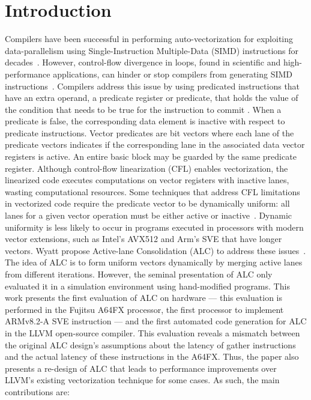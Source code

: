 \section{Introduction}

Compilers have been successful in performing auto-vectorization for exploiting data-parallelism using Single-Instruction Multiple-Data (SIMD) instructions for decades~\cite{scarborough1986vectorizing,levine1991comparative,sreraman2000vectorizing,maleki2011evaluation}.
However, control-flow divergence in loops, found in scientific and high-performance applications, can hinder or stop compilers from generating SIMD instructions~\cite{allen_conversion_1983,park1991ifconversion}.
Compilers address this issue by using predicated instructions that have an extra operand, a predicate register or predicate, that holds the value of the condition that needs to be true for the instruction to commit \cite{allen_conversion_1983,park1991ifconversion,jaewook_shin_superword-level_2005,shin_introducing_2007,shin_evaluating_2009}.
When a predicate is false, the corresponding data element is inactive with respect to predicate instructions.
Vector predicates are bit vectors where each lane of the predicate vectors indicates if the corresponding lane in the associated data vector registers is active.
An entire basic block may be guarded by the same predicate register.
Although control-flow linearization (CFL) enables vectorization, the linearized code executes computations on vector registers with inactive lanes, wasting computational resources.
Some techniques that address CFL limitations in vectorized code require the predicate vector to be dynamically uniform: all lanes for a given vector operation must be either active or inactive~\cite{moll_partial_2018,liu_combining_2022}.
Dynamic uniformity is less likely to occur in programs executed in processors with modern vector extensions, such as Intel's AVX512 and Arm's SVE that have longer vectors.
Wyatt \etal propose Active-lane Consolidation (ALC) to address these issues~\cite{praharenka_vectorizing_2022}.
The idea of ALC is to form uniform vectors dynamically by merging active lanes from different iterations. 
However, the seminal presentation of ALC only evaluated it in a simulation environment using hand-modified programs.
This work presents the first evaluation of ALC on hardware --- this evaluation is performed in the Fujitsu A64FX processor, the first processor to implement ARMv8.2-A SVE instruction --- and the first automated code generation for ALC in the LLVM open-source compiler.
This evaluation reveals a mismatch between the original ALC design's assumptions about the latency of gather instructions and the actual latency of these instructions in the A64FX.
Thus, the paper also presents a re-design of ALC that leads to performance improvements over LLVM's existing vectorization technique for some cases.
As such, the main contributions are:



